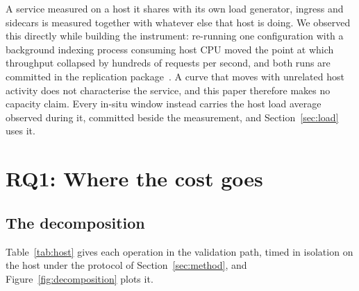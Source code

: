 \documentclass[pdflatex,sn-basic,twocolumn]{sn-jnl}%
\begin{document}
A service measured on a host it shares with its own load generator, ingress and
sidecars is measured together with whatever else that host is doing. We observed
this directly while building the instrument: re-running one configuration with a
background indexing process consuming host CPU moved the point at which
throughput collapsed by hundreds of requests per second, and both runs are
committed in the replication package~\citep{artifact2026}. A curve that moves
with unrelated host activity does not characterise the service, and this paper
therefore makes no capacity claim. Every in-situ window instead carries the host
load average observed during it, committed beside the measurement, and
Section~\ref{sec:load} uses it.

\section{RQ1: Where the cost goes}\label{sec:rq1}

\subsection{The decomposition}

Table~\ref{tab:host} gives each operation in the validation path, timed in
isolation on the host under the protocol of Section~\ref{sec:method}, and
Figure~\ref{fig:decomposition} plots it.
\end{document}

